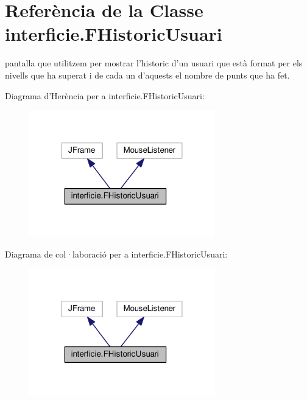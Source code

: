 \hypertarget{classinterficie_1_1_f_historic_usuari}{\section{Referència de la Classe interficie.\+F\+Historic\+Usuari}
\label{classinterficie_1_1_f_historic_usuari}
}


pantalla que utilitzem per mostrar l'historic d'un usuari que està format per els nivells que ha superat i de cada un d'aquests el nombre de punts que ha fet.  




Diagrama d'Herència per a interficie.\+F\+Historic\+Usuari\+:
\nopagebreak
\begin{figure}[H]
\begin{center}
\leavevmode
\includegraphics[width=228pt]{classinterficie_1_1_f_historic_usuari__inherit__graph}
\end{center}
\end{figure}


Diagrama de col·laboració per a interficie.\+F\+Historic\+Usuari\+:
\nopagebreak
\begin{figure}[H]
\begin{center}
\leavevmode
\includegraphics[width=228pt]{classinterficie_1_1_f_historic_usuari__coll__graph}
\end{center}
\end{figure}

